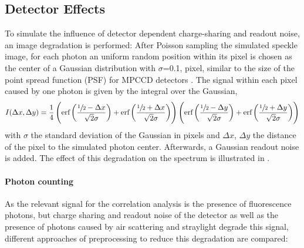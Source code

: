\subsection{Detector Effects}
\label{sect:chargesharing}
To simulate the influence of detector dependent charge-sharing and readout noise, an image degradation is performed: After Poisson sampling the simulated speckle image, for each photon an uniform random position within its pixel is chosen as the center of a Gaussian distribution with $\sigma$=0.1, pixel, similar to the size of the point spread function (PSF) for MPCCD detectors \cite{mpccd}.
The signal within each pixel caused by one photon is given by the integral over the Gaussian,
\begin{equation*}
	I(\Delta x,\Delta y)=\frac{1}{4} \left(\text{erf}\left(\frac{\sfrac{1}{2}-\Delta x}{\sqrt{2}
		\sigma}\right)+\text{erf}\left(\frac{\sfrac{1}{2}+\Delta x}{\sqrt{2} \sigma}\right)\right) \left(\text{erf}\left(\frac{\sfrac{1}{2}-\Delta y}{\sqrt{2}
		\sigma}\right)+\text{erf}\left(\frac{\sfrac{1}{2}+\Delta y}{\sqrt{2} \sigma}\right)\right)
\end{equation*}
with $\sigma$ the standard deviation of the Gaussian in pixels and $\Delta x$, $\Delta y$ the distance of the pixel to the simulated photon center. Afterwards, a Gaussian readout noise is added. The effect of this degradation on the spectrum is illustrated in .



\paragraph{Photon counting}
As the relevant signal for the correlation analysis is the presence of fluorescence photons, but charge sharing and readout noise of the detector as well as the presence of photons caused by air scattering and straylight degrade this signal, different approaches  of preprocessing to reduce this degradation are compared:

